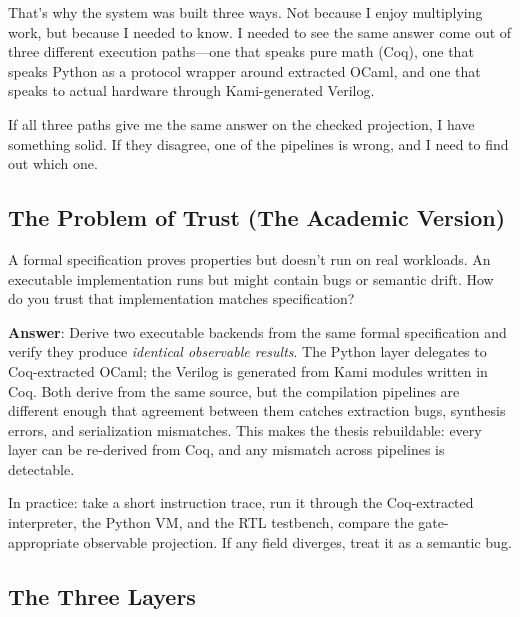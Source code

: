 That's why the system was built three ways. Not because I enjoy multiplying work, but because I needed to know. I needed to see the same answer come out of three different execution paths---one that speaks pure math (Coq), one that speaks Python as a protocol wrapper around extracted OCaml, and one that speaks to actual hardware through Kami-generated Verilog.

If all three paths give me the same answer on the checked projection, I have something solid. If they disagree, one of the pipelines is wrong, and I need to find out which one.

\subsection{The Problem of Trust (The Academic Version)}

A formal specification proves properties but doesn't run on real workloads. An executable implementation runs but might contain bugs or semantic drift. How do you trust that implementation matches specification?

\textbf{Answer}: Derive two executable backends from the same formal specification and verify they produce \textit{identical observable results}. The Python layer delegates to Coq-extracted OCaml; the Verilog is generated from Kami modules written in Coq. Both derive from the same source, but the compilation pipelines are different enough that agreement between them catches extraction bugs, synthesis errors, and serialization mismatches. This makes the thesis rebuildable: every layer can be re-derived from Coq, and any mismatch across pipelines is detectable.

In practice: take a short instruction trace, run it through the Coq-extracted interpreter, the Python VM, and the RTL testbench, compare the gate-appropriate observable projection. If any field diverges, treat it as a semantic bug.

\subsection{The Three Layers}

